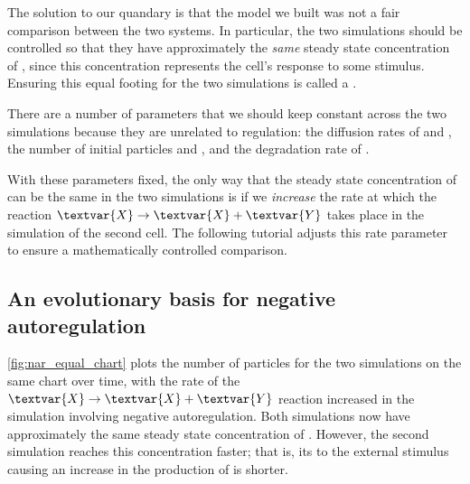 The solution to our quandary is that the model we built was not a fair comparison between the two systems. In particular, the two simulations should be controlled so that they have approximately the \textit{same} steady state concentration of , since this concentration represents the cell's response to some stimulus. Ensuring this equal footing for the two simulations is called a .\\

\begin{qbox}\end{qbox}

There are a number of parameters that we should keep constant across the two simulations because they are unrelated to regulation: the diffusion rates of  and , the number of initial particles  and , and the degradation rate of .

With these parameters fixed, the only way that the steady state concentration of  can be the same in the two simulations is if we \textit{increase} the rate at which the reaction $\textvar{X} \rightarrow \textvar{X} + \textvar{Y}$ takes place in the simulation of the second cell. The following tutorial adjusts this rate parameter to ensure a mathematically controlled comparison.


\FloatBarrier
{}
\subsection{An evolutionary basis for negative autoregulation}

\autoref{fig:nar_equal_chart} plots the number of  particles for the two simulations on the same chart over time, with the rate of the $\textvar{X} \rightarrow \textvar{X} + \textvar{Y}$ reaction increased in the simulation involving negative autoregulation. Both  simulations now have approximately the same steady state concentration of . However, the second simulation reaches this concentration faster; that is, its  to the external stimulus causing an increase in the production of  is shorter.\\


